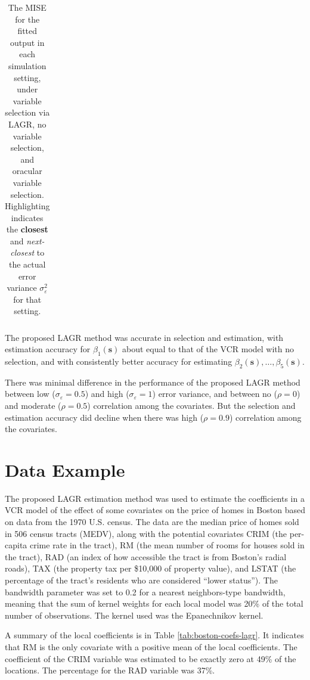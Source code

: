 \documentclass[authoryear,review, 12pt]{elsarticle}
\begin{document}
\begin{table}
\begin{tabular}{ccc|c|ccc}
	\end{tabular}
	\caption{The MISE for the fitted output in each simulation setting, under variable selection via LAGR, no variable selection, and oracular variable selection. Highlighting indicates the \textbf{closest} and \emph{next-closest} to the actual error variance $\sigma_\varepsilon^2$ for that setting.}
	\label{tab:misey}
\end{table}

The proposed LAGR method was accurate in selection and estimation,
with estimation accuracy for $\beta_{1}(\bm{s})$ about equal to that
of the VCR model with no selection, and with consistently better accuracy
for estimating $\beta_{2}(\bm{s}),\dots,\beta_{5}(\bm{s})$.

There was minimal difference in the performance of the proposed LAGR
method between low ($\sigma_{\varepsilon}=0.5$) and high ($\sigma_{\varepsilon}=1$)
error variance, and between no ($\rho=0$) and moderate ($\rho=0.5$)
correlation among the covariates. But the selection and estimation
accuracy did decline when there was high ($\rho=0.9$) correlation
among the covariates.


\section{Data Example\label{sec:example}}




The proposed LAGR estimation method was used to estimate the coefficients
in a VCR model of the effect of some covariates on the price of homes
in Boston based on data from the 1970 U.S. census\citep{Harrison-Rubinfeld-1978,Gilley-Pace-1996,Pace-Gilley-1997}.
The data are the median price of homes sold in 506 census tracts (MEDV),
along with the potential covariates CRIM (the per-capita crime rate
in the tract), RM (the mean number of rooms for houses sold in the
tract), RAD (an index of how accessible the tract is from Boston's
radial roads), TAX (the property tax per \$10,000 of property value),
and LSTAT (the percentage of the tract's residents who are considered
``lower status''). The bandwidth parameter was set to 0.2 for a
nearest neighbors-type bandwidth, meaning that the sum of kernel weights
for each local model was 20\% of the total number of observations.
The kernel used was the Epanechnikov kernel.

A summary of the local coefficients is in Table \ref{tab:boston-coefs-lagr}.
It indicates that RM is the only covariate with a positive mean of
the local coefficients. The coefficient of the CRIM variable was estimated
to be exactly zero at 49\%
of the locations. The percentage for the RAD variable was 37\%.
\end{document}
